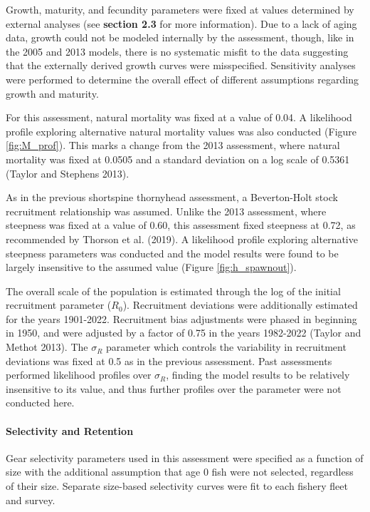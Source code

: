 \documentclass[11pt,
  english,
  letterpaper,
]{article}
\begin{document}
Growth, maturity, and fecundity parameters were fixed at values determined by external analyses (see \textbf{section 2.3} for more information). Due to a lack of aging data, growth could not be modeled internally by the assessment, though, like in the 2005 and 2013 models, there is no systematic misfit to the data suggesting that the externally derived growth curves were misspecified. Sensitivity analyses were performed to determine the overall effect of different assumptions regarding growth and maturity.

For this assessment, natural mortality was fixed at a value of 0.04. A likelihood profile exploring alternative natural mortality values was also conducted (Figure \ref{fig:M_prof}). This marks a change from the 2013 assessment, where natural mortality was fixed at 0.0505 and a standard deviation on a log scale of 0.5361 (Taylor and Stephens 2013).

As in the previous shortspine thornyhead assessment, a Beverton-Holt stock recruitment relationship was assumed. Unlike the 2013 assessment, where steepness was fixed at a value of 0.60, this assessment fixed steepness at 0.72, as recommended by Thorson et al. (2019). A likelihood profile exploring alternative steepness parameters was conducted and the model results were found to be largely insensitive to the assumed value (Figure \ref{fig:h_spawnout}).

The overall scale of the population is estimated through the log of the initial recruitment parameter (\(R_0\)). Recruitment deviations were additionally estimated for the years 1901-2022. Recruitment bias adjustments were phased in beginning in 1950, and were adjusted by a factor of 0.75 in the years 1982-2022 (Taylor and Methot 2013). The \(\sigma_R\) parameter which controls the variability in recruitment deviations was fixed at 0.5 as in the previous assessment. Past assessments performed likelihood profiles over \(\sigma_R\), finding the model results to be relatively insensitive to its value, and thus further profiles over the parameter were not conducted here.

\hypertarget{selectivity-and-retention}{%
\paragraph{Selectivity and Retention}\label{selectivity-and-retention}}

Gear selectivity parameters used in this assessment were specified as a function of size with the additional assumption that age 0 fish were not selected, regardless of their size. Separate size-based selectivity curves were fit to each fishery fleet and survey.
\end{document}
